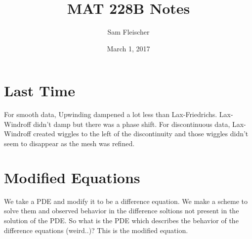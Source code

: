 \documentclass{article}
\title{MAT 228B Notes}
\author{Sam Fleischer}
\date{March 1, 2017}
\begin{document}
    \maketitle

    \section{Last Time}
        For smooth data, Upwinding dampened a lot less than Lax-Friedrichs.  Lax-Windroff didn't damp but there was a phase shift.  For discontinuous data, Lax-Windroff created wiggles to the left of the discontinuity and those wiggles didn't seem to disappear as the mesh was refined.

    \section{Modified Equations}
        We take a PDE and modify it to be a difference equation.  We make a scheme to solve them and observed behavior in the difference soltions not present in the solution of the PDE.  So what is the PDE which describes the behavior of the difference equations (weird..)?  This is the modified equation.
\end{document}
